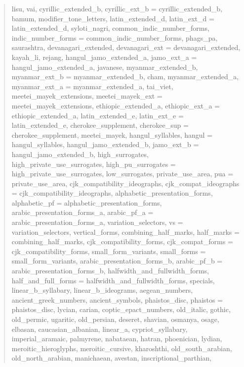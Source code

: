 \documentclass{wg21}
\begin{document}
\begin{quote}
\begin{itemdecl}
{    lisu,
    vai,
    cyrillic_extended_b,
    cyrillic_ext_b = cyrillic_extended_b,
    bamum,
    modifier_tone_letters,
    latin_extended_d,
    latin_ext_d = latin_extended_d,
    syloti_nagri,
    common_indic_number_forms,
    indic_number_forms = common_indic_number_forms,
    phags_pa,
    saurashtra,
    devanagari_extended,
    devanagari_ext = devanagari_extended,
    kayah_li,
    rejang,
    hangul_jamo_extended_a,
    jamo_ext_a = hangul_jamo_extended_a,
    javanese,
    myanmar_extended_b,
    myanmar_ext_b = myanmar_extended_b,
    cham,
    myanmar_extended_a,
    myanmar_ext_a = myanmar_extended_a,
    tai_viet,
    meetei_mayek_extensions,
    meetei_mayek_ext = meetei_mayek_extensions,
    ethiopic_extended_a,
    ethiopic_ext_a = ethiopic_extended_a,
    latin_extended_e,
    latin_ext_e = latin_extended_e,
    cherokee_supplement,
    cherokee_sup = cherokee_supplement,
    meetei_mayek,
    hangul_syllables,
    hangul = hangul_syllables,
    hangul_jamo_extended_b,
    jamo_ext_b = hangul_jamo_extended_b,
    high_surrogates,
    high_private_use_surrogates,
    high_pu_surrogates = high_private_use_surrogates,
    low_surrogates,
    private_use_area,
    pua = private_use_area,
    cjk_compatibility_ideographs,
    cjk_compat_ideographs = cjk_compatibility_ideographs,
    alphabetic_presentation_forms,
    alphabetic_pf = alphabetic_presentation_forms,
    arabic_presentation_forms_a,
    arabic_pf_a = arabic_presentation_forms_a,
    variation_selectors,
    vs = variation_selectors,
    vertical_forms,
    combining_half_marks,
    half_marks = combining_half_marks,
    cjk_compatibility_forms,
    cjk_compat_forms = cjk_compatibility_forms,
    small_form_variants,
    small_forms = small_form_variants,
    arabic_presentation_forms_b,
    arabic_pf_b = arabic_presentation_forms_b,
    halfwidth_and_fullwidth_forms,
    half_and_full_forms = halfwidth_and_fullwidth_forms,
    specials,
    linear_b_syllabary,
    linear_b_ideograms,
    aegean_numbers,
    ancient_greek_numbers,
    ancient_symbols,
    phaistos_disc,
    phaistos = phaistos_disc,
    lycian,
    carian,
    coptic_epact_numbers,
    old_italic,
    gothic,
    old_permic,
    ugaritic,
    old_persian,
    deseret,
    shavian,
    osmanya,
    osage,
    elbasan,
    caucasian_albanian,
    linear_a,
    cypriot_syllabary,
    imperial_aramaic,
    palmyrene,
    nabataean,
    hatran,
    phoenician,
    lydian,
    meroitic_hieroglyphs,
    meroitic_cursive,
    kharoshthi,
    old_south_arabian,
    old_north_arabian,
    manichaean,
    avestan,
    inscriptional_parthian,
}
\end{itemdecl}
\end{quote}
\end{document}
